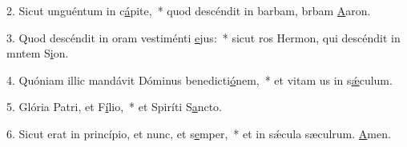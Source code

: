 2. Sicut unguéntum in c\uline{á}pite,~* quod descéndit in barbam, brbam \uline{A}aron.\par 
3. Quod descéndit in oram vestiménti \uline{e}jus:~* sicut ros Hermon, qui descéndit in mntem S\uline{i}on.\par 
4. Quóniam illic mandávit Dóminus benedicti\uline{ó}nem,~* et vitam us in s\uline{ǽ}culum.\par 
5. Glória Patri, et F\uline{í}lio,~* et Spiríti S\uline{a}ncto.\par 
6. Sicut erat in princípio, et nunc, et s\uline{e}mper,~* et in sǽcula sæculrum. \uline{A}men.\par 
